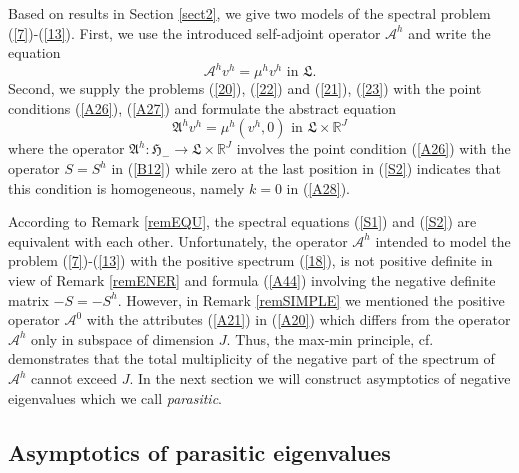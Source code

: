 \documentclass[11pt]{article}%
\numberwithin{equation}{section}
\begin{document}
Based on results in Section \ref{sect2}, we give two models of the spectral
problem (\ref{7})-(\ref{13}). First, we use the introduced self-adjoint
operator $\mathcal{A}^{h}$ and write the equation%
\begin{equation}
\mathcal{A}^{h}v^{h}=\mu^{h}v^{h}\text{ \ in }\mathfrak{L}. \label{S1}%
\end{equation}
Second, we supply the problems (\ref{20}), (\ref{22}) and (\ref{21}),
(\ref{23}) with the point conditions (\ref{A26}), (\ref{A27}) and formulate
the abstract equation%
\begin{equation}
\mathfrak{A}^{h}v^{h}=\mu^{h}(v^{h},0)\text{ \ in }\mathfrak{L\times
}\mathbb{R}^{J} \label{S2}%
\end{equation}
where the operator $\mathfrak{A}^{h}:\mathfrak{H}_{-}\rightarrow
\mathfrak{L\times}\mathbb{R}^{J}$ involves the point condition (\ref{A26})
with the operator $S=S^{h}$ in (\ref{B12}) while zero at the last position in
(\ref{S2}) indicates that this condition is homogeneous, namely $k=0$ in
(\ref{A28}).

According to Remark \ref{remEQU}, the spectral equations (\ref{S1}) and
(\ref{S2}) are equivalent with each other. Unfortunately, the operator
$\mathcal{A}^{h}$ intended to model the problem (\ref{7})-(\ref{13}) with the
positive spectrum (\ref{18}), is not positive definite in view of Remark
\ref{remENER} and formula (\ref{A44}) involving the negative definite matrix
$-S=-S^{h}$. However, in Remark \ref{remSIMPLE} we mentioned the positive
operator $\mathcal{A}^{0}$ with the attributes (\ref{A21}) in (\ref{A20})
which differs from the operator $\mathcal{A}^{h}$ only in subspace of
dimension $J$. Thus, the max-min principle, cf. \cite[Thm. 10.2.2]{BiSo}
demonstrates that the total multiplicity of the negative part of the spectrum
of $\mathcal{A}^{h}$ cannot exceed $J$. In the next section we will construct
asymptotics of negative eigenvalues which we call \textit{parasitic}.

\subsection{Asymptotics of parasitic eigenvalues\label{sect3.4}}
\end{document}
